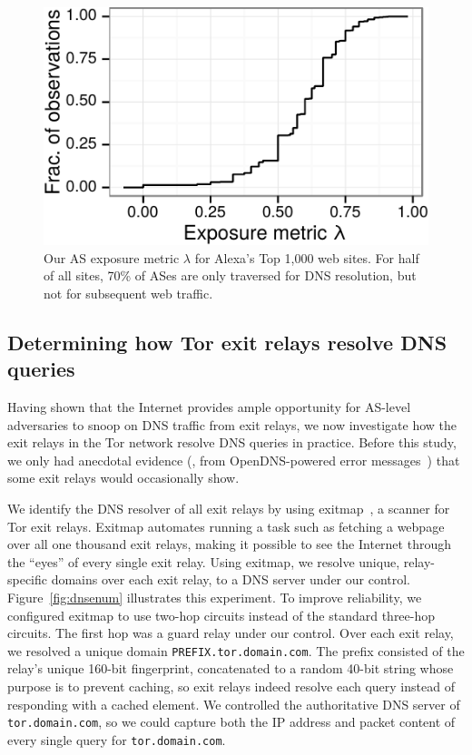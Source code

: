 
\begin{figure}[t]
	\centering
	\includegraphics[width=0.75\linewidth]{figures/dns-exposure.pdf}
	\caption{Our AS exposure metric $\lambda$ for Alexa's Top 1,000 web sites.
	For half of all sites, 70\% of ASes are only traversed for DNS resolution,
	but not for subsequent web traffic.}
	\label{fig:exposure}
\end{figure}

\subsection{Determining how Tor exit relays resolve DNS queries}
\label{sec:mapping-resolvers}

Having shown that the Internet provides ample opportunity for
AS-level adversaries to snoop on DNS traffic from exit relays, we
now investigate how the exit relays in the Tor network resolve DNS
queries in practice. Before this study,
we only had anecdotal evidence (\eg, from OpenDNS-powered error
messages~\cite[\S~4.1]{Winter2014b}) that some exit relays would occasionally
show.

We identify the DNS resolver of all exit relays by using
exitmap~\cite{exitmap}, a scanner for Tor exit relays.  Exitmap automates
running a task such as fetching a webpage over all one thousand exit relays,
making it possible to see the Internet through the ``eyes'' of every single
exit relay.  Using exitmap, we resolve unique, relay-specific domains over
each exit relay, to a DNS server under our control.
Figure~\ref{fig:dnsenum} illustrates this experiment.  To improve reliability, we configured
exitmap to use two-hop circuits instead of the standard three-hop circuits.
The first hop was a guard relay under our control.  Over each exit relay, we
resolved a unique domain {\tt PREFIX.tor.domain.com}.  The prefix consisted of the
relay's unique 160-bit fingerprint, concatenated to a random 40-bit string
whose purpose is to prevent caching, so exit relays indeed resolve each query
instead of responding with a cached element.  We controlled the authoritative
DNS server of {\tt tor.domain.com}, so we could capture both the IP address and packet
content of every single query for {\tt tor.domain.com}.

